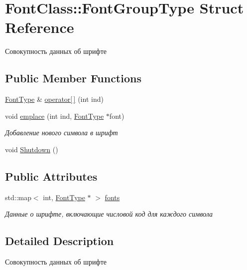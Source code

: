 \hypertarget{struct_font_class_1_1_font_group_type}{}\section{Font\+Class\+:\+:Font\+Group\+Type Struct Reference}
\label{struct_font_class_1_1_font_group_type}


Совокупность данных об шрифте  


\subsection*{Public Member Functions}
\begin{DoxyCompactItemize}
\item 
\hyperlink{struct_font_class_1_1_font_type}{Font\+Type} \& \hyperlink{struct_font_class_1_1_font_group_type_a8af93598b45bd03b0e64516433a0f0ed}{operator\mbox{[}$\,$\mbox{]}} (int ind)
\item 
void \hyperlink{struct_font_class_1_1_font_group_type_a1f650413397fead664d492ef9edea16c}{emplace} (int ind, \hyperlink{struct_font_class_1_1_font_type}{Font\+Type} $\ast$font)
\begin{DoxyCompactList}\small\item\em Добавление нового символа в шрифт \end{DoxyCompactList}\item 
void \hyperlink{struct_font_class_1_1_font_group_type_afed1809b716cfa6dd6c5d33bf643639d}{Shutdown} ()
\end{DoxyCompactItemize}
\subsection*{Public Attributes}
\begin{DoxyCompactItemize}
\item 
std\+::map$<$ int, \hyperlink{struct_font_class_1_1_font_type}{Font\+Type} $\ast$ $>$ \hyperlink{struct_font_class_1_1_font_group_type_a3f9205834f177eedffec9ea36ce6c9b3}{fonts}
\begin{DoxyCompactList}\small\item\em Данные о шрифте, включающие числовой код для каждого символа \end{DoxyCompactList}\end{DoxyCompactItemize}


\subsection{Detailed Description}
Совокупность данных об шрифте 

